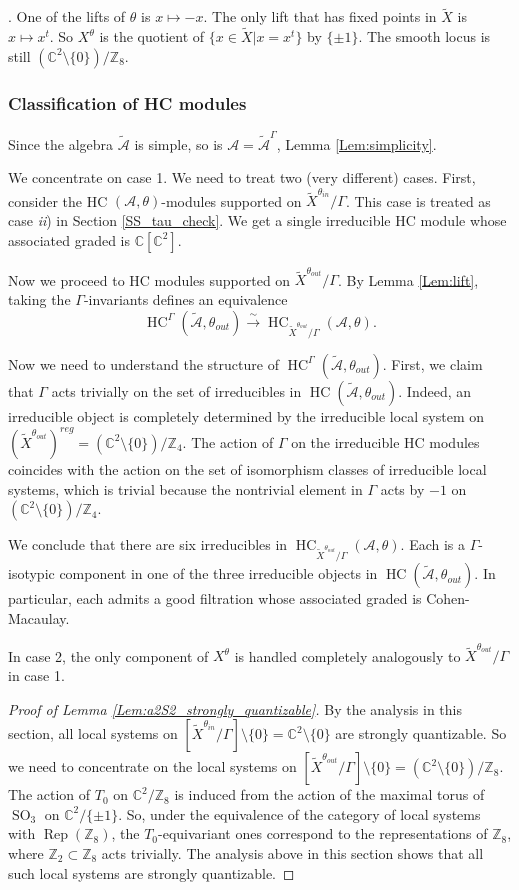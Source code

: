 \documentclass[12pt]{amsart}
\newcommand{\C}{\mathbb{C}}
\newcommand{\A}{\mathcal{A}}
\newcommand{\Z}{\mathbb{Z}}
\newcommand{\HC}{\operatorname{HC}}
\theoremstyle{definition}
\numberwithin{equation}{section}
\begin{document}
. One of the lifts of $\theta$ is $x\mapsto -x$. The only lift
that has fixed points in $\tilde{X}$ is $x\mapsto x^t$. So $X^\theta$
is the quotient of $\{x\in \tilde{X}| x=x^t\}$ by $\{\pm 1\}$. The smooth
locus is still $(\C^2\setminus \{0\})/\Z_8$.

\subsubsection{Classification of HC modules}
Since the algebra $\tilde{\A}$ is simple, so is $\A=\tilde{\A}^\Gamma$, Lemma \ref{Lem:simplicity}.

We concentrate on case 1.
We need to treat two (very different) cases. First, consider the HC $(\A,\theta)$-modules supported
on $\tilde{X}^{\theta_{in}}/\Gamma$. This case is treated as case {\it ii}) in
Section \ref{SS_tau_check}. We get a single irreducible HC module whose associated graded
is $\C[\C^2]$.

Now we proceed to HC modules supported on $\tilde{X}^{\theta_{out}}/\Gamma$.
By Lemma \ref{Lem:lift}, taking the $\Gamma$-invariants defines an equivalence
$$\HC^\Gamma(\tilde{\A},\theta_{out}) \xrightarrow{\sim}  \HC_{\tilde{X}^{\theta_{out}}/\Gamma}(\A,\theta).$$

Now we need to understand the structure of
$\HC^\Gamma(\tilde{\A},\theta_{out})$. First, we claim that $\Gamma$ acts trivially
on the set of irreducibles in $\HC(\tilde{\A},\theta_{out})$. Indeed, an irreducible
object is completely determined by the irreducible local system on $(\tilde{X}^{\theta_{out}})^{reg}
=(\C^2\setminus \{0\})/\Z_4$. The action of $\Gamma$ on the irreducible HC modules coincides
with the action on the set of isomorphism classes of irreducible local systems, which is trivial because the nontrivial element in
$\Gamma$ acts by $-1$ on $(\C^2\setminus \{0\})/\Z_4$.

We conclude that there are six irreducibles in $\HC_{\tilde{X}^{\theta_{out}}/\Gamma}(\A,\theta)$.
Each is a $\Gamma$-isotypic component in one of the three irreducible objects in $\HC(\tilde{\A},\theta_{out})$.
In particular, each admits a good filtration whose associated graded is Cohen-Macaulay.

In case 2, the only component of $X^\theta$ is handled completely analogously to $\tilde{X}^{\theta_{out}}/\Gamma$ in case 1.

\begin{proof}[Proof of Lemma \ref{Lem:a2S2_strongly_quantizable}]
By the analysis in this section, all local systems on $[\tilde{X}^{\theta_{in}}/\Gamma]\setminus \{0\}=\C^2 \setminus \{0\}$ are strongly quantizable. So we need to concentrate on the local systems
on $[\tilde{X}^{\theta_{out}}/\Gamma]\setminus \{0\}=(\C^2\setminus \{0\})/\Z_8$. The action of $T_0$
on $\C^2/\Z_8$ is induced from the action of the maximal torus of $\operatorname{SO}_3$ on $\C^2/\{\pm 1\}$. So, under the equivalence of the category of local systems with $\operatorname{Rep}(\Z_8)$,
the $T_0$-equivariant ones correspond to the representations of $\Z_8$, where $\Z_2\subset \Z_8$
acts trivially. The analysis above in this section shows that all such local systems are
strongly quantizable.
\end{proof}
\end{document}
